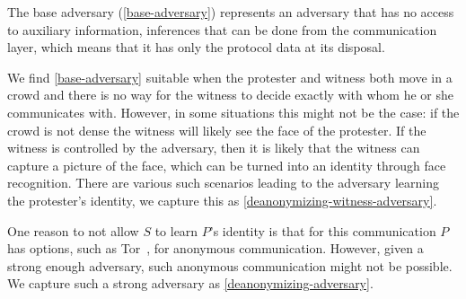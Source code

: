The base adversary (\cref{base-adversary}) represents an adversary that has no 
access to auxiliary information, \eg inferences that can be done from the 
communication layer, which means that it has only the protocol data at its 
disposal.

We find \cref{base-adversary} suitable when the protester and witness both move 
in a crowd and there is no way for the witness to decide exactly with whom he 
or she communicates with.
However, in some situations this might not be the case: \Eg if the crowd is not 
dense the witness will likely see the face of the protester.
If the witness is controlled by the adversary, then it is likely that the 
witness can capture a picture of the face, which can be turned into an identity 
through face recognition.
There are various such scenarios leading to the adversary learning the 
protester's identity, we capture this as 
\cref{deanonymizing-witness-adversary}.

One reason to not allow \(S\) to learn \(P\)'s identity is that for this 
communication \(P\) has options, such as Tor~\cite{Tor}, for anonymous 
communication.
However, given a strong enough adversary, such anonymous communication might not be possible.
We capture such a strong adversary as \cref{deanonymizing-adversary}.

